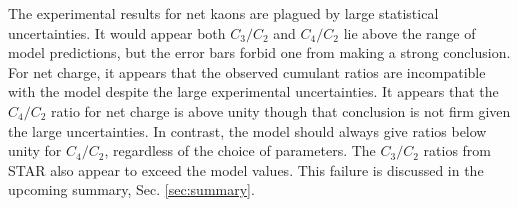 The experimental results for net kaons are plagued by large statistical uncertainties. It would appear both $C_3/C_2$ and $C_4/C_2$ lie above the range of model predictions, but the error bars forbid one from making a strong conclusion. For net charge, it appears that the observed cumulant ratios are incompatible with the model despite the large experimental uncertainties. It appears that the $C_4/C_2$ ratio for net charge is above unity though that conclusion is not firm given the large uncertainties. In contrast, the model should always give ratios below unity for $C_4/C_2$, regardless of the choice of parameters. The $C_3/C_2$ ratios from STAR also appear to exceed the model values. This failure is discussed in the upcoming summary, Sec. \ref{sec:summary}.



